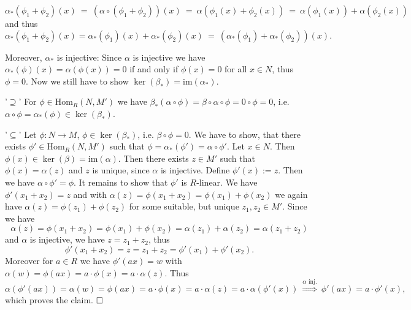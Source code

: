 \documentclass[11pt]{book}
\theoremstyle{nonumberbreak}
\newenvironment{pr}[1][]{\ifthenelse{\equal{#1}{}}{\proof}{\proof[#1]}\rm}{\endproof}
\newenvironment{definprop}[1][]{\ifthenelse{\equal{#1}{}}{\definiprop}{\definiprop[#1]}\rm}{\enddefiniprop}
\begin{document}
\begin{spacing}{1.3}
\begin{definprop}
\begin{pr}
\begin{compactenum}
$$\alpha_*(\phi_1+\phi_2)(x)\ =\ \left(\alpha \circ (\phi_1+\phi_2)\right)(x)\ =\  \alpha \left(\phi_1(x)+\phi_2(x)\right)\ = \ \alpha \left(\phi_1(x)\right) + \alpha\left(\phi_2(x)\right)$$
and thus
$$\alpha_*(\phi_1+\phi_2)(x) =  \alpha_*(\phi_1)(x)+\alpha_*(\phi_2)(x)\ = \ \left(\alpha_*(\phi_1)+ \alpha_*(\phi_2)\right)(x).$$

Moreover, $\alpha_*$ is injective: Since $\alpha$ is injective we have $\alpha_*(\phi)(x) = \alpha(\phi(x))=0$ if and only if $\phi(x)=0$ for all $x \in N$, thus $\phi=0$.
Now we still have to show $\ker(\beta_*)=\textrm{im}(\alpha_*)$.
\begin{compactitem}
\item['$\supseteq$'] For $\phi \in \textrm{Hom}_R(N,M')$ we have $\beta_*(\alpha \circ \phi)= \beta \circ \alpha \circ \phi = 0 \circ \phi = 0$, i.e. $\alpha \circ \phi = \alpha_*(\phi) \in \ker(\beta_*)$.
\item['$\subseteq$'] Let $\phi:N \longrightarrow M$, $\phi \in \ker(\beta_*)$, i.e. $\beta \circ \phi=0$. 
We have to show, that there exists $\phi' \in \textrm{Hom}_R(N,M')$ such that $\phi=\alpha_*(\phi')=\alpha \circ \phi'$.
Let $x \in N$. Then $\phi(x) \in \ker(\beta)=\textrm{im}(\alpha)$.
Then there exists $z \in M'$ such that $\phi(x)=\alpha(z)$ and $z$ is unique, since $\alpha$ is injective.
Define $\phi'(x):=z$. Then we have $\alpha \circ \phi'=\phi$. 
It remains to show that $\phi'$ is $R$-linear. We have
$\phi'(x_1+x_2)=z$ and with $\alpha(z)=\phi(x_1+x_2)=\phi(x_1)+\phi(x_2)$ we again have $\alpha(z)= \phi(z_1)+\phi(z_2)$ for some suitable, but unique $z_1, z_2 \in M'$. Since we have
$$\alpha(z)=\phi(x_1+x_2)= \phi(x_1)+\phi(x_2)=\alpha(z_1)+\alpha(z_2)=\alpha(z_1+z_2)$$
and $\alpha$ is injective, we have $z=z_1+z_2$, thus
$$\phi'(x_1+x_2)=z=z_1+z_2=\phi'(x_1)+\phi'(x_2).$$
Moreover for $a \in R$ we have $\phi'(ax)=w$ with $\alpha(w)=\phi(ax)=a\cdot \phi(x)=a \cdot \alpha(z)$. Thus
$$\alpha\left(\phi'(ax)\right)=\alpha(w)=\phi(ax)=a \cdot \phi(x)=a \cdot \alpha(z)=a \cdot \alpha\left(\phi'(x)\right) \ \overset{\alpha \textrm{ inj.}}{\Longrightarrow} \ \phi'(ax)=a \cdot \phi'(x),$$
which proves the claim. $\hfill \Box$
\end{compactitem}
\end{compactenum}
\end{pr}
\end{definprop}



\end{spacing}
\end{document}
